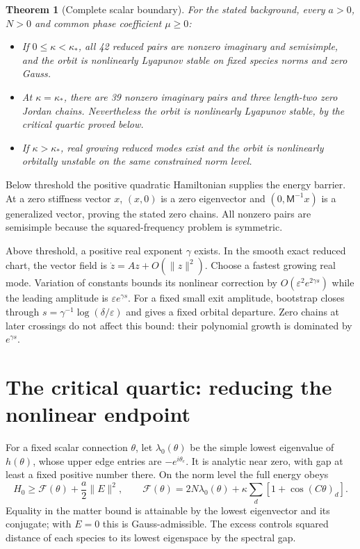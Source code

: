 \documentclass[11pt,a4paper]{article}
\newtheorem{theorem}{Theorem}\newtheorem{lemma}[theorem]{Lemma}\newtheorem{proposition}[theorem]{Proposition}
\begin{document}
\begin{theorem}[Complete scalar boundary]\label{th:main}
For the stated background, every $a>0$, $N>0$ and common phase coefficient $\mu\geq0$:
\begin{itemize}
\item If $0\leq\kappa<\kappa_*$, all 42 reduced pairs are nonzero imaginary and semisimple, and the orbit is nonlinearly Lyapunov stable on fixed species norms and zero Gauss.
\item At $\kappa=\kappa_*$, there are 39 nonzero imaginary pairs and three length-two zero Jordan chains. Nevertheless the orbit is nonlinearly Lyapunov stable, by the critical quartic proved below.
\item If $\kappa>\kappa_*$, real growing reduced modes exist and the orbit is nonlinearly orbitally unstable on the same constrained norm level.
\end{itemize}
\end{theorem}
Below threshold the positive quadratic Hamiltonian supplies the energy barrier. At a zero stiffness vector $x$, $(x,0)$ is a zero eigenvector and $(0,\mathsf M^{-1}x)$ is a generalized vector, proving the stated zero chains. All nonzero pairs are semisimple because the squared-frequency problem is symmetric.

Above threshold, a positive real exponent $\gamma$ exists. In the smooth exact reduced chart, the vector field is $\dot z=Az+O(\|z\|^2)$. Choose a fastest growing real mode. Variation of constants bounds its nonlinear correction by $O(\varepsilon^2e^{2\gamma s})$ while the leading amplitude is $\varepsilon e^{\gamma s}$. For a fixed small exit amplitude, bootstrap closes through $s=\gamma^{-1}\log(\delta/\varepsilon)$ and gives a fixed orbital departure. Zero chains at later crossings do not affect this bound: their polynomial growth is dominated by $e^{\gamma s}$.

\newpage
\section{The critical quartic: reducing the nonlinear endpoint}
For a fixed scalar connection $\theta$, let $\lambda_0(\theta)$ be the simple lowest eigenvalue of $h(\theta)$, whose upper edge entries are $-e^{i\theta_e}$. It is analytic near zero, with gap at least a fixed positive number there. On the norm level the full energy obeys
\[
H_0\geq \mathcal F(\theta)+\frac a2\|E\|^2,
\qquad
\mathcal F(\theta)=2N\lambda_0(\theta)+
\kappa\sum_d[1+\cos(C\theta)_d].
\]
Equality in the matter bound is attainable by the lowest eigenvector and its conjugate; with $E=0$ this is Gauss-admissible. The excess controls squared distance of each species to its lowest eigenspace by the spectral gap.
\end{document}
